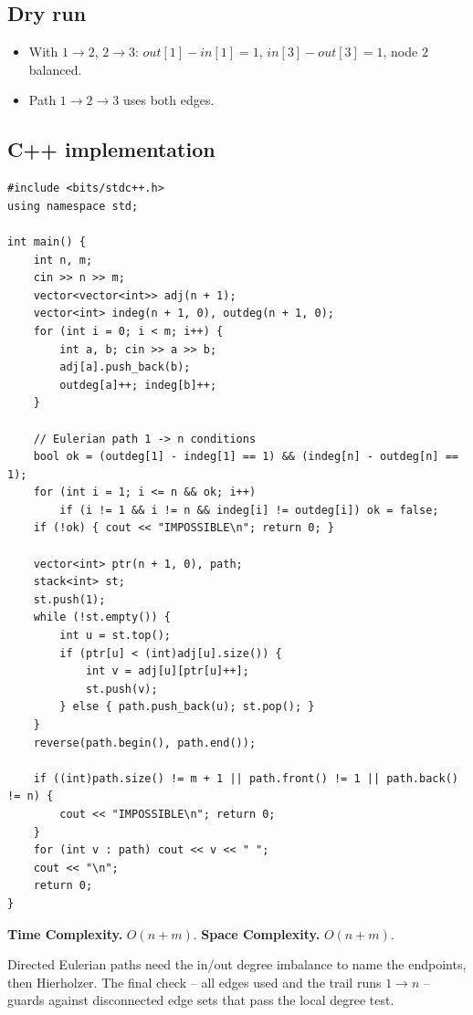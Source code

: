 \subsection*{Dry run}


\begin{itemize}
  \item With $1\!\to\!2$, $2\!\to\!3$: $\textit{out}[1]{-}\textit{in}[1]{=}
        1$, $\textit{in}[3]{-}\textit{out}[3]{=}1$, node $2$ balanced.
  \item Path $1\to2\to3$ uses both edges.
\end{itemize}

\subsection*{C++ implementation}

\begin{lstlisting}
#include <bits/stdc++.h>
using namespace std;

int main() {
    int n, m;
    cin >> n >> m;
    vector<vector<int>> adj(n + 1);
    vector<int> indeg(n + 1, 0), outdeg(n + 1, 0);
    for (int i = 0; i < m; i++) {
        int a, b; cin >> a >> b;
        adj[a].push_back(b);
        outdeg[a]++; indeg[b]++;
    }

    // Eulerian path 1 -> n conditions
    bool ok = (outdeg[1] - indeg[1] == 1) && (indeg[n] - outdeg[n] == 1);
    for (int i = 1; i <= n && ok; i++)
        if (i != 1 && i != n && indeg[i] != outdeg[i]) ok = false;
    if (!ok) { cout << "IMPOSSIBLE\n"; return 0; }

    vector<int> ptr(n + 1, 0), path;
    stack<int> st;
    st.push(1);
    while (!st.empty()) {
        int u = st.top();
        if (ptr[u] < (int)adj[u].size()) {
            int v = adj[u][ptr[u]++];
            st.push(v);
        } else { path.push_back(u); st.pop(); }
    }
    reverse(path.begin(), path.end());

    if ((int)path.size() != m + 1 || path.front() != 1 || path.back() != n) {
        cout << "IMPOSSIBLE\n"; return 0;
    }
    for (int v : path) cout << v << " ";
    cout << "\n";
    return 0;
}
\end{lstlisting}

\begin{complexitybox}
\textbf{Time Complexity.} $O(n+m)$. \textbf{Space Complexity.} $O(n+m)$.
\end{complexitybox}

\begin{takeawaybox}
Directed Eulerian paths need the in/out degree imbalance to name the
endpoints, then Hierholzer. The final check -- all edges used and the trail
runs $1\to n$ -- guards against disconnected edge sets that pass the local
degree test.
\end{takeawaybox}
